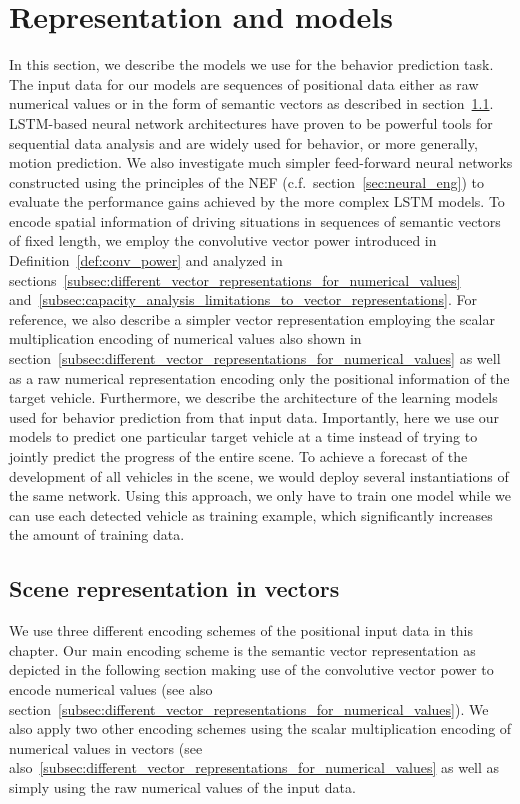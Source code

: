 \section{Representation and models}
\label{sec:repr_models}

In this section, we describe the models we use for the behavior prediction task.
The input data for our models are sequences of positional data either as raw numerical values or in the form of semantic vectors as described in section~\ref{subsec:scene_representation_in_vectors}.
\ac{LSTM}-based neural network architectures have proven to be powerful tools for sequential data analysis and are widely used for behavior, or more generally, motion prediction.
We also investigate much simpler feed-forward neural networks constructed using the principles of the \acf{NEF} (c.f.\ section~\ref{sec:neural_eng}) to evaluate the performance gains achieved by the more complex \ac{LSTM} models.
To encode spatial information of driving situations in sequences of semantic vectors of fixed length, we employ the convolutive vector power introduced in Definition~\ref{def:conv_power} and analyzed in sections~\ref{subsec:different_vector_representations_for_numerical_values} and~\ref{subsec:capacity_analysis_limitations_to_vector_representations}.
For reference, we also describe a simpler vector representation employing the scalar multiplication encoding of numerical values also shown in section~\ref{subsec:different_vector_representations_for_numerical_values} as well as a raw numerical representation encoding only the positional information of the target vehicle.  
Furthermore, we describe the architecture of the learning models used for behavior prediction from that input data.
Importantly, here we use our models to predict one particular target vehicle at a time instead of trying to jointly predict the progress of the entire scene.
To achieve a forecast of the development of all vehicles in the scene, we would deploy several instantiations of the same network.
Using this approach, we only have to train one model while we can use each detected vehicle as training example, which significantly increases the amount of training data. 

\subsection{Scene representation in vectors}%
\label{subsec:scene_representation_in_vectors}

We use three different encoding schemes of the positional input data in this chapter.
Our main encoding scheme is the semantic vector representation as depicted in the following section making use of the convolutive vector power to encode numerical values (see also section~\ref{subsec:different_vector_representations_for_numerical_values}).
We also apply two other encoding schemes using the scalar multiplication encoding of numerical values in vectors (see also~\ref{subsec:different_vector_representations_for_numerical_values} as well as simply using the raw numerical values of the input data.

